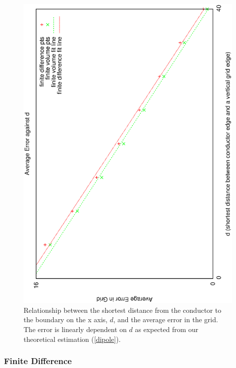 \documentclass[aps,twocolumn,pre,nofootinbib,10pt]{revtex4-1}
\begin{document}
\begin{figure}
\includegraphics[height=\breite \columnwidth,angle=-90]{position.eps}
\caption{Relationship between the shortest distance from the conductor to the boundary on the x axis, $d$, and the average error in the grid. The error is linearly dependent on $d$ as expected from our theoretical estimation (\ref{dipole}).}
\label{fig:fd_distance}
\end{figure}


\subsubsection{Finite Difference}
\end{document}
